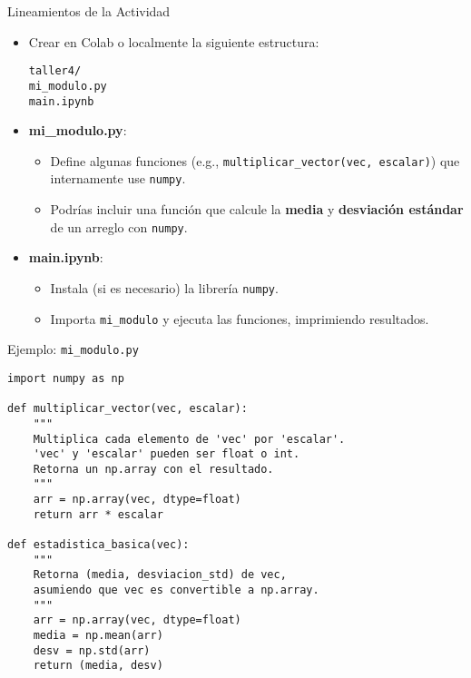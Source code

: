 \documentclass[10pt]{beamer}
\begin{document}
\begin{frame}{Lineamientos de la Actividad}
  \begin{itemize}
    \item Crear en Colab o localmente la siguiente estructura:
    
      \texttt{taller4/}\\
      \quad \texttt{mi\_modulo.py}\\
      \quad \texttt{main.ipynb} \quad {}\\
    
    \item \textbf{mi\_modulo.py}:
      \begin{itemize}
        \item Define algunas funciones (e.g., \texttt{multiplicar\_vector(vec, escalar)}) que internamente use \texttt{numpy}.
        \item Podrías incluir una función que calcule la \textbf{media} y \textbf{desviación estándar} de un arreglo con \texttt{numpy}.
      \end{itemize}
    \item \textbf{main.ipynb}:
      \begin{itemize}
        \item Instala (si es necesario) la librería \texttt{numpy}.
        \item Importa \texttt{mi\_modulo} y ejecuta las funciones, imprimiendo resultados.
      \end{itemize}
  \end{itemize}
\end{frame}

\begin{frame}[fragile]{Ejemplo: \texttt{mi\_modulo.py}}
\begin{verbatim}
import numpy as np

def multiplicar_vector(vec, escalar):
    """
    Multiplica cada elemento de 'vec' por 'escalar'.
    'vec' y 'escalar' pueden ser float o int.
    Retorna un np.array con el resultado.
    """
    arr = np.array(vec, dtype=float)
    return arr * escalar

def estadistica_basica(vec):
    """
    Retorna (media, desviacion_std) de vec,
    asumiendo que vec es convertible a np.array.
    """
    arr = np.array(vec, dtype=float)
    media = np.mean(arr)
    desv = np.std(arr)
    return (media, desv)
\end{verbatim}
\end{frame}
\end{document}
